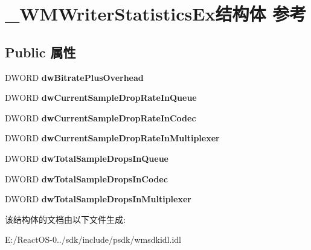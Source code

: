 \hypertarget{struct___w_m_writer_statistics_ex}{}\section{\+\_\+\+W\+M\+Writer\+Statistics\+Ex结构体 参考}
\label{struct___w_m_writer_statistics_ex}
\subsection*{Public 属性}
\begin{DoxyCompactItemize}
\item 
\mbox{\label{struct___w_m_writer_statistics_ex_ae5ca8b7823af6f77d5fec703f5aec617}} 
D\+W\+O\+RD {\bfseries dw\+Bitrate\+Plus\+Overhead}
\item 
\mbox{\label{struct___w_m_writer_statistics_ex_ad5ea529419e686c0cc609681a5c6b841}} 
D\+W\+O\+RD {\bfseries dw\+Current\+Sample\+Drop\+Rate\+In\+Queue}
\item 
\mbox{\label{struct___w_m_writer_statistics_ex_a8d908050ee9701979c189e664fb940ae}} 
D\+W\+O\+RD {\bfseries dw\+Current\+Sample\+Drop\+Rate\+In\+Codec}
\item 
\mbox{\label{struct___w_m_writer_statistics_ex_a4054afd4ba2bfec5c0580d78975b102f}} 
D\+W\+O\+RD {\bfseries dw\+Current\+Sample\+Drop\+Rate\+In\+Multiplexer}
\item 
\mbox{\label{struct___w_m_writer_statistics_ex_a909f6c321ad1373a1afcfea74efd8ec5}} 
D\+W\+O\+RD {\bfseries dw\+Total\+Sample\+Drops\+In\+Queue}
\item 
\mbox{\label{struct___w_m_writer_statistics_ex_a893c4c558be35140a159709dacdb3550}} 
D\+W\+O\+RD {\bfseries dw\+Total\+Sample\+Drops\+In\+Codec}
\item 
\mbox{\label{struct___w_m_writer_statistics_ex_a001db0c55844c64f8b5ab44582b9cd6b}} 
D\+W\+O\+RD {\bfseries dw\+Total\+Sample\+Drops\+In\+Multiplexer}
\end{DoxyCompactItemize}


该结构体的文档由以下文件生成\+:\begin{DoxyCompactItemize}
\item 
E\+:/\+React\+O\+S-\/0../sdk/include/psdk/wmsdkidl.\+idl\end{DoxyCompactItemize}
